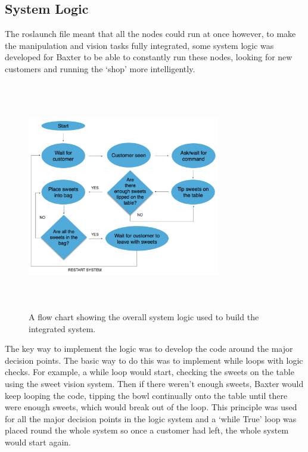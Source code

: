 \subsection{System Logic}
The roslaunch file meant that all the nodes could run at once however, to make the manipulation and vision tasks fully integrated, some system logic was developed for Baxter to be able to constantly run these nodes, looking for new customers and running the `shop' more intelligently.
\begin{figure}[H]
        \centering 
        \includegraphics[width=0.75\textwidth, height=10cm]{completesystemlogic.png}
        \caption{A flow chart showing the overall system logic used to build the integrated system.}
         \label{fig:fakegripper}
\end{figure}
The key way to implement the logic was to develop the code around the major decision points. The basic way to do this was to implement while loops with logic checks. For example, a while loop would start, checking the sweets on the table using the sweet vision system. Then if there weren't enough sweets, Baxter would keep looping the code,  tipping the bowl continually onto the table until there were enough sweets, which would  break out of the loop. This principle was used for all the major decision points in the logic system and a `while True' loop was placed round the whole system so once a customer had left, the whole system would start again.
